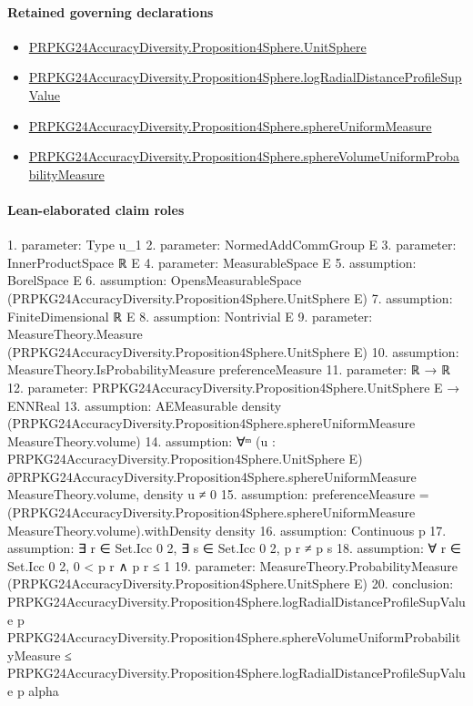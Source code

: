 \documentclass[10pt]{article}
\begin{document}
\paragraph{Retained governing declarations}
\begin{itemize}\raggedright
\item \hyperlink{governing-declaration-2eb72c62aa16afd0}{PRPKG24\allowbreak{}Accuracy\allowbreak{}Diversity.\allowbreak{}Proposition4\allowbreak{}Sphere.\allowbreak{}Unit\allowbreak{}Sphere}
\item \hyperlink{governing-declaration-5bb85ad03d6a9e69}{PRPKG24\allowbreak{}Accuracy\allowbreak{}Diversity.\allowbreak{}Proposition4\allowbreak{}Sphere.\allowbreak{}log\allowbreak{}Radial\allowbreak{}Distance\allowbreak{}Profile\allowbreak{}Sup\allowbreak{}Value}
\item \hyperlink{governing-declaration-eaa19779f7cfd160}{PRPKG24\allowbreak{}Accuracy\allowbreak{}Diversity.\allowbreak{}Proposition4\allowbreak{}Sphere.\allowbreak{}sphere\allowbreak{}Uniform\allowbreak{}Measure}
\item \hyperlink{governing-declaration-8e890c3a6904c331}{PRPKG24\allowbreak{}Accuracy\allowbreak{}Diversity.\allowbreak{}Proposition4\allowbreak{}Sphere.\allowbreak{}sphere\allowbreak{}Volume\allowbreak{}Uniform\allowbreak{}Probability\allowbreak{}Measure}
\end{itemize}
\paragraph{Lean-elaborated claim roles}\begin{ReviewVerbatim}
1. parameter: Type u_1
2. parameter: NormedAddCommGroup E
3. parameter: InnerProductSpace ℝ E
4. parameter: MeasurableSpace E
5. assumption: BorelSpace E
6. assumption: OpensMeasurableSpace (PRPKG24AccuracyDiversity.Proposition4Sphere.UnitSphere E)
7. assumption: FiniteDimensional ℝ E
8. assumption: Nontrivial E
9. parameter: MeasureTheory.Measure (PRPKG24AccuracyDiversity.Proposition4Sphere.UnitSphere E)
10. assumption: MeasureTheory.IsProbabilityMeasure preferenceMeasure
11. parameter: ℝ → ℝ
12. parameter: PRPKG24AccuracyDiversity.Proposition4Sphere.UnitSphere E → ENNReal
13. assumption: AEMeasurable density (PRPKG24AccuracyDiversity.Proposition4Sphere.sphereUniformMeasure MeasureTheory.volume)
14. assumption: ∀ᵐ (u :
  PRPKG24AccuracyDiversity.Proposition4Sphere.UnitSphere
    E) ∂PRPKG24AccuracyDiversity.Proposition4Sphere.sphereUniformMeasure MeasureTheory.volume,
  density u ≠ 0
15. assumption: preferenceMeasure =
  (PRPKG24AccuracyDiversity.Proposition4Sphere.sphereUniformMeasure MeasureTheory.volume).withDensity density
16. assumption: Continuous p
17. assumption: ∃ r ∈ Set.Icc 0 2, ∃ s ∈ Set.Icc 0 2, p r ≠ p s
18. assumption: ∀ r ∈ Set.Icc 0 2, 0 < p r ∧ p r ≤ 1
19. parameter: MeasureTheory.ProbabilityMeasure (PRPKG24AccuracyDiversity.Proposition4Sphere.UnitSphere E)
20. conclusion: PRPKG24AccuracyDiversity.Proposition4Sphere.logRadialDistanceProfileSupValue p
    PRPKG24AccuracyDiversity.Proposition4Sphere.sphereVolumeUniformProbabilityMeasure ≤
  PRPKG24AccuracyDiversity.Proposition4Sphere.logRadialDistanceProfileSupValue p alpha
\end{ReviewVerbatim}
\end{document}
